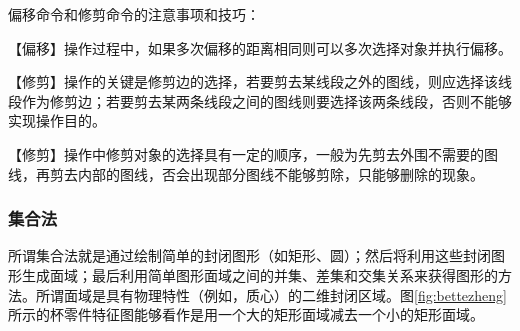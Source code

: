 偏移命令和修剪命令的注意事项和技巧：
\begin{tips}
\item 【偏移】操作过程中，如果多次偏移的距离相同则可以多次选择对象并执行偏移。
\item 【修剪】操作的关键是修剪边的选择，若要剪去某线段之外的图线，则应选择该线段作为修剪边；若要剪去某两条线段之间的图线则要选择该两条线段，否则不能够实现操作目的。
\item 【修剪】操作中修剪对象的选择具有一定的顺序，一般为先剪去外围不需要的图线，再剪去内部的图线，否会出现部分图线不能够剪除，只能够删除的现象。
\end{tips}

\subsubsection{集合法}
所谓集合法就是通过绘制简单的封闭图形（如矩形、圆）；然后将利用这些封闭图形生成面域；最后利用简单图形面域之间的并集、差集和交集关系来获得图形的方法。所谓面域是具有物理特性（例如，质心）的二维封闭区域。图\ref{fig:bettezheng}所示的杯零件特征图能够看作是用一个大的矩形面域减去一个小的矩形面域。

